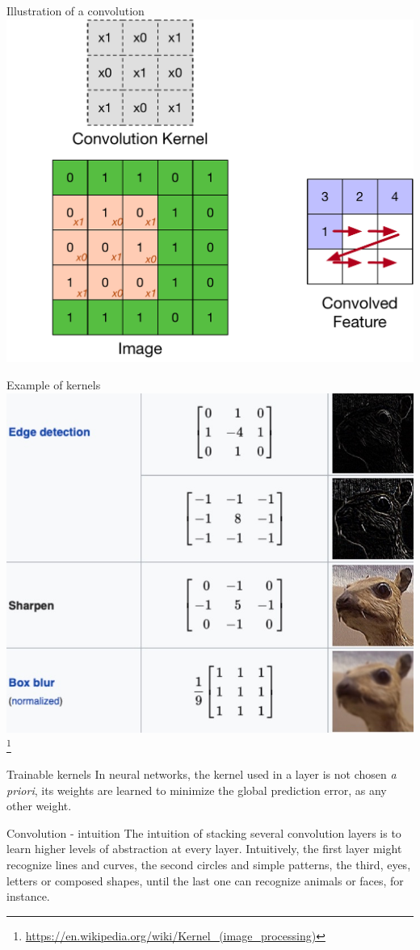 \documentclass[a4paper,11pt]{book}
\begin{document}
\begin{textbox}{Illustration of a convolution}
\centering
\includegraphics[width=0.6\linewidth]{pics/convolution.pdf}
\end{textbox}

\begin{textbox}{Example of kernels}
\centering
\includegraphics[width=0.8\linewidth]{pics/kernels.jpg}
\footnote{\url{https://en.wikipedia.org/wiki/Kernel_(image_processing)}}
\end{textbox}

\begin{textbox}{Trainable kernels}
In neural networks, the kernel used in a layer is not chosen \textit{a priori}, its weights are learned to minimize the global prediction error, as any other weight.
\end{textbox}

\begin{textbox}{Convolution - intuition}
The intuition of stacking several convolution layers is to learn higher levels of abstraction at every layer. Intuitively, the first layer might recognize lines and curves, the second circles and simple patterns, the third, eyes, letters or composed shapes, until the last one can recognize animals or faces, for instance.
\end{textbox}
\end{document}
